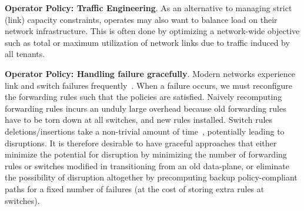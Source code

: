 \begin{compactitemize}
\item \textbf{Operator Policy: Traffic Engineering}. As an alternative to
  managing strict (link) capacity constraints, operates may also want
  to balance load on their network infrastructure. This is often done
  by optimizing a network-wide objective such as total or maximum
  utilization of network links due to traffic induced by all tenants.
  
  
 
 \item \textbf{Operator Policy: Handling failure gracefully}. Modern
   networks experience link and switch failures frequently~\cite{}.
   When a failure occurs, we must reconfigure the forwarding rules
   such that the policies are satisfied. Naively recomputing
   forwarding rules incurs an unduly large overhead because old
   forwarding rules have to be torn down at all switches, and new
   rules installed. Switch rules deletions/insertions take a
   non-trivial amount of time~\cite{keqiang-sosr15}, potentially
   leading to disruptions. It is therefore desirable to have graceful
   approaches that either minimize the potential for disruption by
   minimizing the number of forwarding rules or switches modified in
   transitioning from an old data-plane, or eliminate the possibility
   of disruption altogether by precomputing backup policy-compliant
   paths for a fixed number of failures (at the cost of storing extra
   rules at switches).
   

\end{compactitemize}

